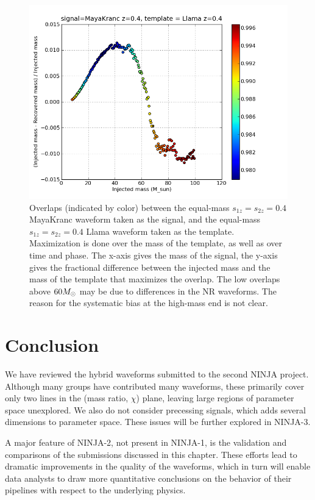 \begin{figure}
  \includegraphics[width=\linewidth]{figures/ninja2/maya_llama_z0d4_max_over_m}
  \caption[Overlaps between spinning submissions maximized over mass]{
  \label{f:max_over_m_z4}
Overlaps (indicated by color) between the equal-mass $s_{1z} = s_{2z}
= 0.4$ MayaKranc waveform taken as the signal, and the equal-mass
$s_{1z} = s_{2z} = 0.4$ Llama waveform taken
as the template.  Maximization is done over the mass of the template,
as well as over time and phase.  The x-axis gives the mass of the
signal, the y-axis gives the fractional difference between the
injected mass and the mass of the template that maximizes the overlap.
The low overlaps above $60 M_\odot$ may be due to differences in the NR
waveforms.  The reason for the systematic bias at the high-mass end is
not clear.}
\end{figure}%


\section{Conclusion}

We have reviewed the hybrid waveforms submitted to the second NINJA
project.  Although many groups have contributed many waveforms, these
primarily cover only two lines  in the (mass ratio, $\chi$) plane,
leaving large regions of parameter space unexplored.  We also do not
consider precessing signals, which adds several dimensions to
parameter space.  These issues will be further explored in NINJA-3.

A major feature of NINJA-2, not present in NINJA-1, is the validation 
and comparisons of the submissions discussed in this chapter.  These 
efforts lead to dramatic improvements in the quality of the waveforms,
which in turn will enable data analysts to draw more quantitative 
conclusions on the behavior of their pipelines with respect to the
underlying physics.

